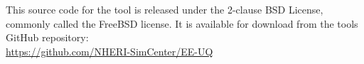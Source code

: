This source code for the tool is released under the 2-clause BSD License, commonly called the FreeBSD license. 
It is available for download from the tools GitHub repository: \\
\href{https://github.com/NHERI-SimCenter/EE-UQ}{https://github.com/NHERI-SimCenter/EE-UQ}